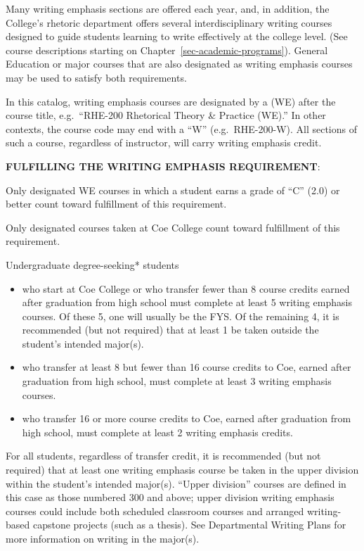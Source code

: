 \documentclass[
  letterpaper,
]{scrbook}
\begin{document}
Many writing emphasis sections are offered each year, and, in addition,
the College's rhetoric department offers several interdisciplinary
writing courses designed to guide students learning to write effectively
at the college level. (See course descriptions starting on
Chapter~\ref{sec-academic-programs}). General Education or major courses
that are also designated as writing emphasis courses may be used to
satisfy both requirements.

In this catalog, writing emphasis courses are designated by a (WE) after
the course title, e.g.~``RHE-200 Rhetorical Theory \& Practice (WE).''
In other contexts, the course code may end with a ``W''
(e.g.~RHE-200-W). All sections of such a course, regardless of
instructor, will carry writing emphasis credit.

\textbf{FULFILLING THE WRITING EMPHASIS REQUIREMENT}:

Only designated WE courses in which a student earns a grade of ``C''
(2.0) or better count toward fulfillment of this requirement.

Only designated courses taken at Coe College count toward fulfillment of
this requirement.

Undergraduate degree-seeking* students

\begin{itemize}
\item
  who start at Coe College or who transfer fewer than 8 course credits
  earned after graduation from high school must complete at least 5
  writing emphasis courses. Of these 5, one will usually be the FYS. Of
  the remaining 4, it is recommended (but not required) that at least 1
  be taken outside the student's intended major(s).
\item
  who transfer at least 8 but fewer than 16 course credits to Coe,
  earned after graduation from high school, must complete at least 3
  writing emphasis courses.
\item
  who transfer 16 or more course credits to Coe, earned after graduation
  from high school, must complete at least 2 writing emphasis credits.
\end{itemize}

For all students, regardless of transfer credit, it is recommended (but
not required) that at least one writing emphasis course be taken in the
upper division within the student's intended major(s). ``Upper
division'' courses are defined in this case as those numbered 300 and
above; upper division writing emphasis courses could include both
scheduled classroom courses and arranged writing-based capstone projects
(such as a thesis). See Departmental Writing Plans for more information
on writing in the major(s).
\end{document}
